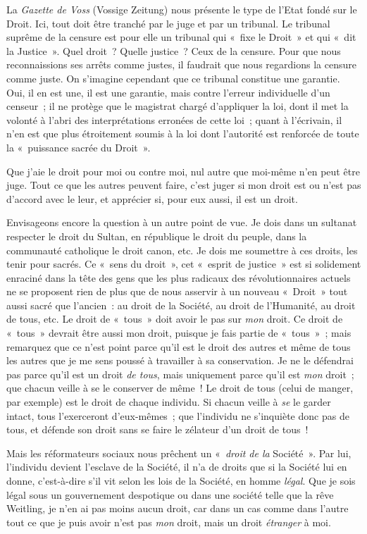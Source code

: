 \documentclass[french,twoside]{book} %
\begin{document}
La \emph{Gazette de Voss} (Vossige Zeitung) nous présente le type de l’Etat fondé sur le Droit. Ici, tout doit être tranché par le juge et par un tribunal. Le tribunal suprême de la censure est pour elle un tribunal qui « fixe le Droit » et qui « dit la Justice ». Quel droit ? Quelle justice ? Ceux de la censure. Pour que nous reconnaissions ses arrêts comme justes, il faudrait que nous regardions la censure comme juste. On  s’imagine cependant que ce tribunal constitue une garantie. Oui, il en est une, il est une garantie, mais contre l’erreur individuelle d’un censeur ; il ne protège que le magistrat chargé d’appliquer la loi, dont il met la volonté à l’abri des interprétations erronées de cette loi ; quant à l’écrivain, il n’en est que plus étroitement soumis à la loi dont l’autorité est renforcée de toute la « puissance sacrée du Droit ».\par
Que j’aie le droit pour moi ou contre moi, nul autre que moi-même n’en peut être juge. Tout ce que les autres peuvent faire, c’est juger si mon droit est ou n’est pas d’accord avec le leur, et apprécier si, pour eux aussi, il est un droit.\par
Envisageons encore la question à un autre point de vue. Je dois dans un sultanat respecter le droit du Sultan, en république le droit du peuple, dans la communauté catholique le droit canon, etc. Je dois me soumettre à ces droits, les tenir pour sacrés. Ce « sens du droit », cet « esprit de justice » est si solidement enraciné dans la tête des gens que les plus radicaux des révolutionnaires actuels ne se proposent rien de plus que de nous asservir à un nouveau « Droit » tout aussi sacré que l’ancien : au droit de la Société, au droit de l’Humanité, au droit de tous, etc. Le droit de « tous » doit avoir le pas sur \emph{mon} droit. Ce droit de « tous » devrait être aussi mon droit, puisque je fais partie de « tous » ; mais remarquez que ce n’est point parce qu’il est le droit des autres et même de tous les autres que je me sens poussé à travailler à sa conservation. Je ne le défendrai pas parce qu’il est un droit \emph{de tous}, mais uniquement parce qu’il est \emph{mon} droit ; que chacun veille à se le conserver de même ! Le droit de tous (celui de manger, par exemple) est le droit de chaque individu. Si chacun veille à \emph{se} le garder intact, tous l’exerceront d’eux-mêmes ; que l’individu ne s’inquiète donc pas de tous, et défende son droit sans se faire le zélateur d’un droit de tous !\par
Mais les réformateurs sociaux nous prêchent un  « \emph{droit de la} Société ». Par lui, l’individu devient l’esclave de la Société, il n’a de droits que si la Société lui en donne, c’est-à-dire s’il vit selon les lois de la Société, en homme \emph{légal}. Que je sois légal sous un gouvernement despotique ou dans une société telle que la rêve Weitling, je n’en ai pas moins aucun droit, car dans un cas comme dans l’autre tout ce que je puis avoir n’est pas \emph{mon} droit, mais un droit \emph{étranger} à moi.\par
\end{document}
